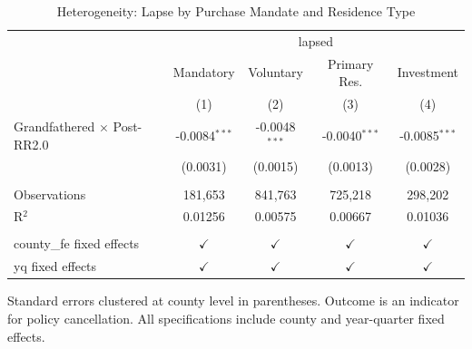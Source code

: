 \begin{table}[htbp]
   \caption{\label{tab:heterogeneity} Heterogeneity: Lapse by Purchase Mandate and Residence Type}
   \bigskip
   \centering
   \begin{tabular}{lcccc}
      \toprule
       & \multicolumn{4}{c}{lapsed}\\
                                         & Mandatory       & Voluntary       & Primary Res.    & Investment \\   
                                         & (1)             & (2)             & (3)             & (4)\\  
      \midrule 
      Grandfathered $\times$ Post-RR2.0  & -0.0084$^{***}$ & -0.0048$^{***}$ & -0.0040$^{***}$ & -0.0085$^{***}$\\   
                                         & (0.0031)        & (0.0015)        & (0.0013)        & (0.0028)\\   
       \\
      Observations                       & 181,653         & 841,763         & 725,218         & 298,202\\  
      R$^2$                              & 0.01256         & 0.00575         & 0.00667         & 0.01036\\  
       \\
      county\_fe fixed effects           & $\checkmark$    & $\checkmark$    & $\checkmark$    & $\checkmark$\\   
      yq fixed effects                   & $\checkmark$    & $\checkmark$    & $\checkmark$    & $\checkmark$\\   
      \bottomrule
   \end{tabular}
   
   \par \raggedright 
   Standard errors clustered at county level in parentheses. Outcome is an indicator for policy cancellation. All specifications include county and year-quarter fixed effects.
\end{table}
